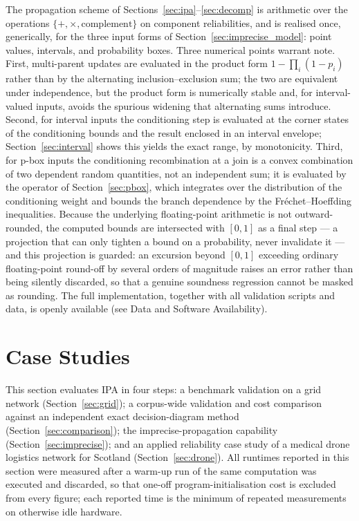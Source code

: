 \documentclass[preprint,12pt]{elsarticle}
\theoremstyle{definition}
\begin{document}
The propagation scheme of Sections~\ref{sec:ipa}--\ref{sec:decomp} is arithmetic over the operations
$\{+,\times,\text{complement}\}$ on component reliabilities, and is realised once, generically, for the
three input forms of Section~\ref{sec:imprecise_model}: point values, intervals, and probability boxes.
Three numerical points warrant note. First, multi-parent updates are evaluated in the product form
$1-\prod_i(1-p_i)$ rather than by the alternating inclusion--exclusion sum; the two are equivalent under
independence, but the product form is numerically stable and, for interval-valued inputs, avoids the
spurious widening that alternating sums introduce. Second, for interval inputs the conditioning step is
evaluated at the corner states of the conditioning bounds and the result enclosed in an interval
envelope; Section~\ref{sec:interval} shows this yields the exact range, by monotonicity. Third, for
p-box inputs the conditioning recombination at a join is a convex combination of two dependent random
quantities, not an independent sum; it is evaluated by the operator of Section~\ref{sec:pbox}, which
integrates over the distribution of the conditioning weight and bounds the branch dependence by the
Fr\'echet--Hoeffding inequalities. Because the underlying floating-point arithmetic is not
outward-rounded, the computed bounds are intersected with $[0,1]$ as a final step --- a projection that
can only tighten a bound on a probability, never invalidate it --- and this projection is guarded: an
excursion beyond $[0,1]$ exceeding ordinary floating-point round-off by several orders of magnitude
raises an error rather than being silently discarded, so that a genuine soundness regression cannot be
masked as rounding. The full implementation, together with all validation scripts and data, is openly
available (see Data and Software Availability).

\section{Case Studies}\label{sec:cases}

This section evaluates IPA in four steps: a benchmark validation on a grid network
(Section~\ref{sec:grid}); a corpus-wide validation and cost comparison against an independent exact
decision-diagram method (Section~\ref{sec:comparison}); the imprecise-propagation capability
(Section~\ref{sec:imprecise}); and an applied reliability case study of a medical drone logistics
network for Scotland (Section~\ref{sec:drone}). All runtimes reported in this section were measured
after a warm-up run of the same computation was executed and discarded, so that one-off
program-initialisation cost is excluded from every figure; each reported time is the minimum of repeated
measurements on otherwise idle hardware.
\end{document}
